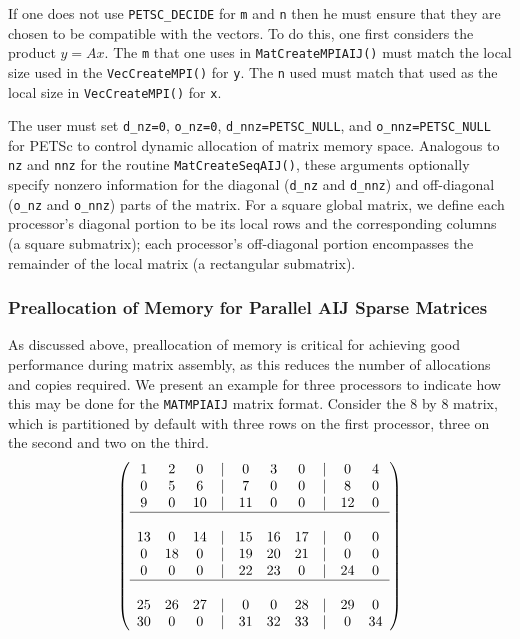 If one does not use {\tt PETSC\_DECIDE} for
{\tt m} and {\tt n} then he must ensure that they are chosen to be
compatible with the vectors. To do this, one first considers the product 
$y = A x$. The {\tt m} that one uses in {\tt MatCreateMPIAIJ()}
must match the local size used in the {\tt VecCreateMPI()} for {\tt y}.
The {\tt n} used must match that used as the local size in 
{\tt VecCreateMPI()} for {\tt x}. 

The user must set {\tt d\_nz=0}, {\tt o\_nz=0}, {\tt d\_nnz=PETSC\_NULL}, and 
{\tt o\_nnz=PETSC\_NULL} for PETSc to control dynamic allocation of matrix
memory space.  Analogous to {\tt nz} and {\tt nnz} for the routine 
{\tt MatCreateSeqAIJ()}, these arguments optionally specify 
nonzero information for the diagonal ({\tt d\_nz} and {\tt d\_nnz}) and 
off-diagonal ({\tt o\_nz} and {\tt o\_nnz}) parts of the matrix. 
For a square global matrix, we define each processor's diagonal portion 
to be its local rows and the corresponding columns (a square submatrix);  
each processor's off-diagonal portion encompasses the remainder of the
local matrix (a rectangular submatrix).  

\subsubsection{Preallocation of Memory for Parallel AIJ Sparse Matrices}

As discussed above, preallocation of memory is critical for achieving good
performance during matrix assembly, as this reduces the number of
allocations and copies required.  We present an example for
three processors to indicate how this may be done for the {\tt MATMPIAIJ}
matrix format.  Consider the 8 by
8 matrix, which is partitioned by default with three rows on the first
processor, three on the second and two on the third.  {\small
\[
\left( \begin{array}{cccccccccc} 
1  & 2  & 0  & | & 0  & 3  & 0  & |  & 0  & 4  \\
0  & 5  & 6  & | & 7  & 0  & 0  & |  & 8  & 0 \\
9  & 0  & 10 & | & 11 & 0  & 0  & |  & 12 & 0  \\
\hline \\
13 & 0  & 14 & | & 15 & 16 & 17 & |  & 0  & 0  \\
0  & 18 & 0  & | & 19 & 20 & 21 & |  & 0  & 0 \\
0  & 0  & 0  & | & 22 & 23 & 0  & |  & 24 & 0 \\
\hline \\
25 & 26 & 27 & | & 0  & 0  & 28 & |  & 29 & 0 \\
30 & 0  & 0  & | & 31 & 32 & 33 & |  & 0  &34 
\end{array} \right)
\]
}

